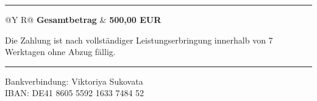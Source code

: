 \documentclass[11pt,a4paper]{article}
\begin{document}
\vspace{6pt}
\hrule
\vspace{6pt}

\begin{tabularx}{\textwidth}{@{}Y R@{}}
\textbf{Gesamtbetrag} & \textbf{500,00 EUR} \\
\end{tabularx}

\vspace{6pt}

Die Zahlung ist nach vollst\"andiger Leistungserbringung innerhalb von 7 Werktagen ohne Abzug f\"allig.

\vfill
\hrule
\vspace{3pt}
\small
Bankverbindung: Viktoriya Sukovata\\
IBAN: DE41 8605 5592 1633 7484 52
\end{document}
